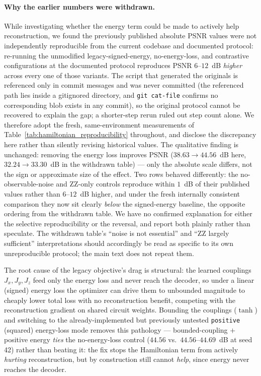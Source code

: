 \documentclass[11pt]{article}
\begin{document}
\paragraph{Why the earlier numbers were withdrawn.}\label{sec:hamiltonian_followup} While investigating whether the energy term could be made to actively help reconstruction, we found the previously published absolute PSNR values were not independently reproducible from the current codebase and documented protocol: re-running the unmodified legacy-signed-energy, no-energy-loss, and contrastive configurations at the documented protocol reproduces PSNR $6$--$12$~dB \emph{higher} across every one of those variants. The script that generated the originals is referenced only in commit messages and was never committed (the referenced path lies inside a gitignored directory, and \texttt{git cat-file} confirms no corresponding blob exists in any commit), so the original protocol cannot be recovered to explain the gap; a shorter-step rerun ruled out step count alone. We therefore adopt the fresh, same-environment measurements of Table~\ref{tab:hamiltonian_reproducibility} throughout, and disclose the discrepancy here rather than silently revising historical values. The qualitative finding is unchanged: removing the energy loss improves PSNR ($38.63\rightarrow44.56$~dB here, $32.24\rightarrow33.30$~dB in the withdrawn table) --- only the absolute scale differs, not the sign or approximate size of the effect. Two rows behaved differently: the no-observable-noise and ZZ-only controls reproduce within $1$~dB of their published values rather than $6$--$12$~dB higher, and under the fresh internally consistent comparison they now sit clearly \emph{below} the signed-energy baseline, the opposite ordering from the withdrawn table. We have no confirmed explanation for either the selective reproducibility or the reversal, and report both plainly rather than speculate. The withdrawn table's ``noise is not essential'' and ``ZZ largely sufficient'' interpretations should accordingly be read as specific to its own unreproducible protocol; the main text does not repeat them.

The root cause of the legacy objective's drag is structural: the learned couplings $J_x,J_y,J_z$ feed only the energy loss and never reach the decoder, so under a linear (signed) energy loss the optimizer can drive them to unbounded magnitude to cheaply lower total loss with no reconstruction benefit, competing with the reconstruction gradient on shared circuit weights. Bounding the couplings ($\tanh$) and switching to the already-implemented but previously untested \texttt{positive} (squared) energy-loss mode removes this pathology --- bounded-coupling $+$ positive energy \emph{ties} the no-energy-loss control ($44.56$ vs.\ $44.56$--$44.69$~dB at seed 42) rather than beating it: the fix stops the Hamiltonian term from actively \emph{hurting} reconstruction, but by construction still cannot \emph{help}, since energy never reaches the decoder.
\end{document}
